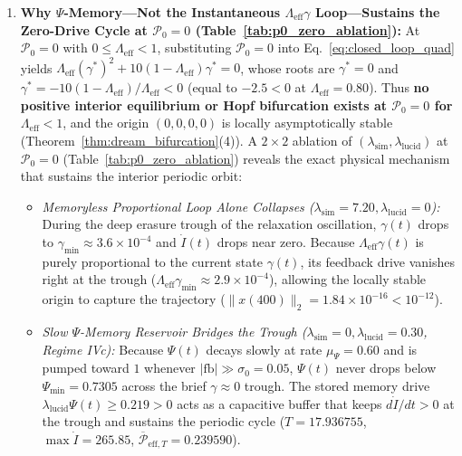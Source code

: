 \documentclass[11pt,a4paper]{article}
\theoremstyle{definition}
\begin{document}
\begin{enumerate}
  \item \textbf{Why $\Psi$-Memory---Not the Instantaneous $\Lambda_{\mathrm{eff}}\gamma$ Loop---Sustains the Zero-Drive Cycle at $\mathcal{P}_0 = 0$ (Table~\ref{tab:p0_zero_ablation}):} At $\mathcal{P}_0 = 0$ with $0 \le \Lambda_{\mathrm{eff}} < 1$, substituting $\mathcal{P}_0 = 0$ into Eq.~\eqref{eq:closed_loop_quad} yields $\Lambda_{\mathrm{eff}}(\gamma^*)^2 + 10(1 - \Lambda_{\mathrm{eff}})\gamma^* = 0$, whose roots are $\gamma^* = 0$ and $\gamma^* = -10(1-\Lambda_{\mathrm{eff}})/\Lambda_{\mathrm{eff}} < 0$ (equal to $-2.5 < 0$ at $\Lambda_{\mathrm{eff}} = 0.80$). Thus \textbf{no positive interior equilibrium or Hopf bifurcation exists at $\mathcal{P}_0 = 0$ for $\Lambda_{\mathrm{eff}} < 1$}, and the origin $(0,0,0,0)$ is locally asymptotically stable (Theorem~\ref{thm:dream_bifurcation}(4)). A $2\times 2$ ablation of $(\lambda_{\mathrm{sim}}, \lambda_{\mathrm{lucid}})$ at $\mathcal{P}_0 = 0$ (Table~\ref{tab:p0_zero_ablation}) reveals the exact physical mechanism that sustains the interior periodic orbit:
  \begin{itemize}
    \item \emph{Memoryless Proportional Loop Alone Collapses ($\lambda_{\mathrm{sim}} = 7.20, \lambda_{\mathrm{lucid}} = 0$):} During the deep erasure trough of the relaxation oscillation, $\gamma(t)$ drops to $\gamma_{\min} \approx 3.6 \times 10^{-4}$ and $\dot{I}(t)$ drops near zero. Because $\Lambda_{\mathrm{eff}}\gamma(t)$ is purely proportional to the current state $\gamma(t)$, its feedback drive vanishes right at the trough ($\Lambda_{\mathrm{eff}}\gamma_{\min} \approx 2.9 \times 10^{-4}$), allowing the locally stable origin to capture the trajectory ($\|x(400)\|_2 = 1.84 \times 10^{-16} < 10^{-12}$).
    \item \emph{Slow $\Psi$-Memory Reservoir Bridges the Trough ($\lambda_{\mathrm{sim}} = 0, \lambda_{\mathrm{lucid}} = 0.30$, Regime IVc):} Because $\Psi(t)$ decays slowly at rate $\mu_\Psi = 0.60$ and is pumped toward $1$ whenever $|\mathrm{fb}| \gg \sigma_0 = 0.05$, $\Psi(t)$ never drops below $\Psi_{\min} = 0.7305$ across the brief $\gamma \approx 0$ trough. The stored memory drive $\lambda_{\mathrm{lucid}}\Psi(t) \ge 0.219 > 0$ acts as a capacitive buffer that keeps $d\dot{I}/dt > 0$ at the trough and sustains the periodic cycle ($T = 17.936755$, $\max \dot{I} = 265.85$, $\overline{\mathcal{P}}_{\mathrm{eff},T} = 0.239590$).

\end{itemize}
\end{enumerate}
\end{document}
